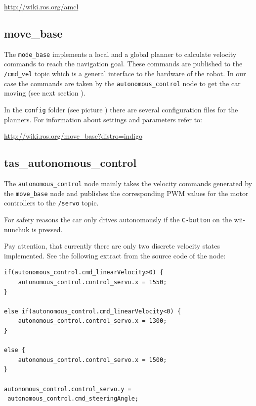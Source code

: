\hyperref[http://wiki.ros.org/amcl]{http://wiki.ros.org/amcl}



\subsection{move\_base}
\label{sec:tas_package_move_base}

The \texttt{mode\_base} implements a local and a global planner to calculate velocity commands to reach the navigation goal. These commands are published to the \texttt{/cmd\_vel} topic which is a general interface to the hardware of the robot. In our case the commands are taken by the \texttt{autonomous\_control} node to get the car moving (see next section ).

In the \texttt{config} folder (see picture ) there are several configuration files for the planners. For information about settings and parameters refer to:

\hyperref[http://wiki.ros.org/move_base?distro=indigo]{http://wiki.ros.org/move\_base?distro=indigo}


\subsection{tas\_autonomous\_control}
\label{sec:tas_package_autonomous_control}
The  \texttt{autonomous\_control} node mainly takes the velocity commands generated by the \texttt{move\_base} node and publishes the corresponding PWM values for the motor controllers to the \texttt{/servo} topic.

For safety reasons the car only drives autonomously if the \texttt{C-button} on the wii-nunchuk is pressed.

Pay attention, that currently there are only two discrete velocity states implemented. See the following extract from the source code of the node:

\begin{lstlisting}
if(autonomous_control.cmd_linearVelocity>0) {
	autonomous_control.control_servo.x = 1550;
}

else if(autonomous_control.cmd_linearVelocity<0) {
	autonomous_control.control_servo.x = 1300;
}

else {
	autonomous_control.control_servo.x = 1500;
}

autonomous_control.control_servo.y = 
 autonomous_control.cmd_steeringAngle;
\end{lstlisting}






